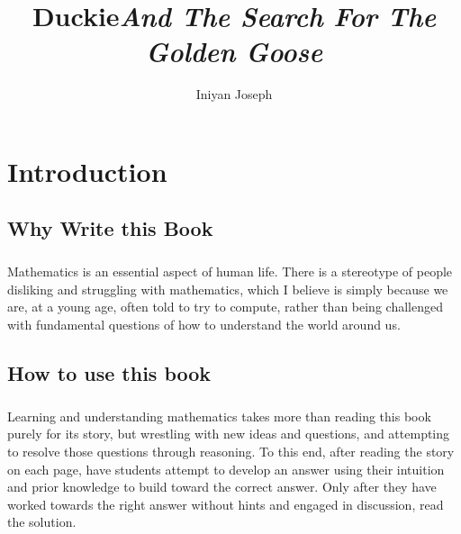 \documentclass[a4paper,11pt ]{book}
\title{\textbf{Duckie}\linebreak \textit{And The Search For The Golden Goose}}
\author{Iniyan Joseph}
\begin{document}
\newcommand{\subchapter}[5]{
\begin{multicols*}{2}
\raggedcolumns
\section{#1}
\vfill
\paragraph*{} #2
\vfill
\paragraph*{} #3
\vfill
\paragraph*{Definition} #4
 \columnbreak
\begin{center}
\vspace*{\fill}
    \texttt{[image: \#5]}
    \vspace*{\fill}
\end{center}
\end{multicols*}
\vfill
\pagebreak
}

\maketitle
\chapter*{Introduction}
\section*{Why Write this Book}
\paragraph*{} Mathematics is an essential aspect of human life. There is a stereotype of people disliking and struggling with mathematics, which I believe is simply because we are, at a young age, often told to try to compute, rather than being challenged with fundamental questions of how to understand the world around us. 
\section*{How to use this book}
\paragraph*{} Learning and understanding mathematics takes more than reading this book purely for its story, but wrestling with new ideas and questions, and attempting to resolve those questions through reasoning. To this end, after reading the story on each page, have students attempt to develop an answer using their intuition and prior knowledge to build toward the correct answer. Only after they have worked towards the right answer without hints and engaged in discussion, read the solution.
\end{document}
